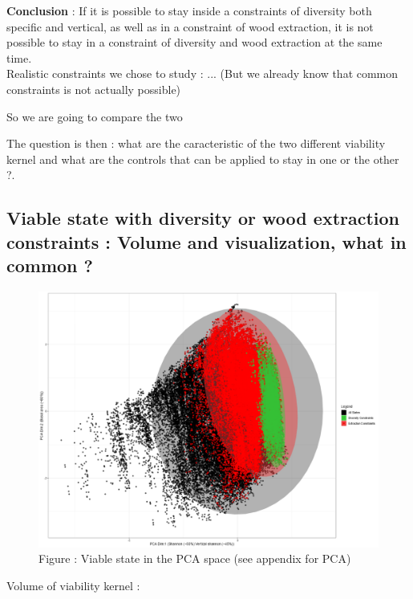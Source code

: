 \documentclass{article}
\begin{document}
\textbf{Conclusion} : If it is possible to stay inside a constraints of diversity both specific and vertical, as well as in a constraint of wood extraction, it is not possible to stay in a constraint of diversity and wood extraction at the same time.\\

Realistic constraints we chose to study : ... (But we already know that common constraints is not actually possible)

So we are going to compare the two

The question is then : what are the caracteristic of the two different viability kernel and what are the controls that can be applied to stay in one or the other ?.\\

\subsection{Viable state with diversity or wood extraction constraints : Volume and visualization, what in common ?}

\begin{figure}[h]
    \centering
    \includegraphics[width=\textwidth]{Figure/PCA_Viab_kernel_plot.png}
    \caption{Figure : Viable state in the PCA space (see appendix for PCA)}
    \label{fig:PCA_plot}
\end{figure}

Volume of viability kernel : \\
\end{document}
